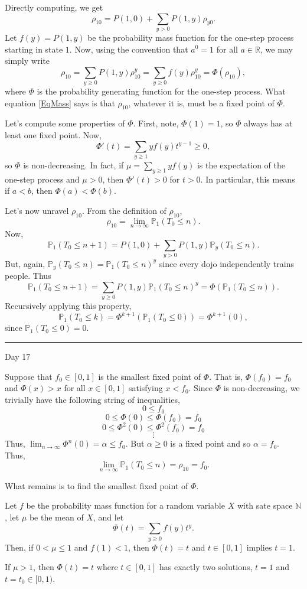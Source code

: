 \documentclass{problemset}
\newcommand{\R}{\mathbb{R}}
\newcommand{\N}{\mathbb{N}}
\renewcommand{\P}{\mathbb{P}}
\newcommand{\fatrule}[1]{\vspace{.3cm}\hrule {\hfill \sf #1}\par}
\begin{document}
	Directly computing, we get
	\[
		\rho_{10} = P(1,0)+\sum_{y> 0}P(1,y)\rho_{y0}.
	\]
	Let $f(y) = P(1,y)$ be the probability mass function for the one-step process starting in state $1$.
	Now, using the convention that $a^0=1$ for all $a\in \R$, we may simply write
	\begin{equation}
		\label{EqMass}
		\rho_{10} = \sum_{y\geq 0} P(1,y)\rho_{10}^y = \sum_{y\geq 0} f(y)\rho_{10}^y=\Phi(\rho_{10}),
	\end{equation}
	where $\Phi$ is the probability generating function for the one-step process.  What equation \eqref{EqMass}
	says is that $\rho_{10}$, whatever it is, must be a fixed point of $\Phi$.

	Let's compute some properties of $\Phi$.  First, note, $\Phi(1)=1$, so $\Phi$ always has at least one
	fixed point.  Now,
	\[
		\Phi'(t) = \sum_{y\geq 1} yf(y) t^{y-1} \geq 0,
	\]
	so $\Phi$ is non-decreasing.  In fact, if $\mu=\sum_{y\geq 1} yf(y)$ is the expectation of the one-step
	process and $\mu > 0$, then $\Phi'(t) > 0$ for $t>0$.  In particular, this means if $a<b$, then $\Phi(a)<\Phi(b)$.

	Let's now unravel $\rho_{10}$.  From the definition of $\rho_{10}$,
	\[
		\rho_{10} = \lim_{n\to\infty} \P_1(T_0\leq n).
	\]
	Now,
	\[
		\P_1(T_0\leq n+1) = P(1,0) + \sum_{y > 0} P(1,y)\P_y(T_0 \leq n).
	\]
	But, again, $\P_y(T_0 \leq n) = \P_1(T_0\leq n)^y$ since every dojo independently trains people.  Thus
	\[
		\P_1(T_0\leq n+1) = \sum_{y \geq 0} P(1,y)\P_1(T_0 \leq n)^y=\Phi(\P_1(T_0\leq n)).
	\]
	Recursively applying this property,
	\[
		\P_1(T_0\leq k) = \Phi^{k+1}(\P_1(T_0\leq 0)) = \Phi^{k+1}(0),
	\]
	since $\P_1(T_0\leq 0)=0$.

	\fatrule{Day 17}
	Suppose that $f_0\in[0,1]$ is the smallest fixed point of $\Phi$.  That is, $\Phi(f_0) = f_0$ and $\Phi(x) > x$ for all $x\in[0,1]$
	satisfying $x< f_0$.  Since $\Phi$ is non-decreasing, we trivially have the following string of inequalities,
	\[
		0  \leq f_0 
	\]\[
		0\leq \Phi(0)  \leq \Phi(f_0)=f_0 
	\]\[
		0\leq \Phi^2(0)  \leq \Phi^2(f_0)=f_0 
	\]\[
		\vdots
	\]
	Thus, $\lim_{n\to\infty} \Phi^n(0)=\alpha\leq f_0$.  But $\alpha\geq 0$ is a fixed point and so $\alpha=f_0$.  Thus,
	\[
		\lim_{n\to\infty} \P_1(T_0 \leq n) = \rho_{10} = f_0.
	\]

	What remains is to find the smallest fixed point of $\Phi$.

	\begin{theorem}
		Let $f$ be the probability mass function for a random variable $X$ with sate space $\N$, let $\mu$ be the
		mean of $X$, and let
		\[
			\Phi(t)= \sum_{y\geq 0} f(y) t^y.
		\]
		Then, if $0<\mu \leq 1$ and $f(1)<1$, then $\Phi(t)=t$ and $t\in[0,1]$ implies $t=1$.

		If $\mu > 1$, then $\Phi(t)=t$ where $t\in[0,1]$ has exactly two solutions, $t=1$ and
		$t=t_0\in[0,1)$.
	\end{theorem}
\end{document}
